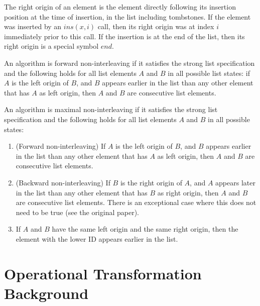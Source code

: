 \documentclass[sigplan,10pt,review,anonymous]{acmart}
\begin{document}
\begin{definition}
  The right origin of an element is the element directly following its insertion position at the time of insertion, in the list including tombstones. If the element was inserted by 
  an $ins(x, i)$ call, then its right origin was at index $i$ immediately prior to this call. If the insertion is at the end of the list, then its right origin is a special symbol
  $\mathit{end}$.
\end{definition}

\begin{property}
  An algorithm is forward non-interleaving if it satisfies the strong list specification and the following holds for all list elements $A$ and $B$ in all possible list
  states: if $A$ is the left origin of $B$, and $B$ appears earlier in the list than any other element that has $A$ as left origin, then $A$ and $B$ are consecutive list
  elements.
\end{property}

\begin{property}
  An algorithm is maximal non-interleaving if it satisfies the strong list specification and the following holds for all list elements $A$ and $B$ in all possible states:
  \begin{enumerate}
    \item
      (Forward non-interleaving) If $A$ is the left origin of $B$, and $B$ appears earlier in the list than any other element that has $A$ as left origin, then $A$ and $B$ 
      are consecutive list elements.
    \item
      (Backward non-interleaving) If $B$ is the right origin of $A$, and $A$ appears later in the list than any other element that has $B$ as right origin, then $A$ and $B$ are
      consecutive list elements. There is an exceptional case where this does not need to be true (see the original paper).
    \item
      If $A$ and $B$ have the same left origin and the same right origin, then the element with the lower ID appears earlier in the list.
  \end{enumerate}
\end{property}

\section{Operational Transformation Background} \label{sec:otbackground}
\end{document}
